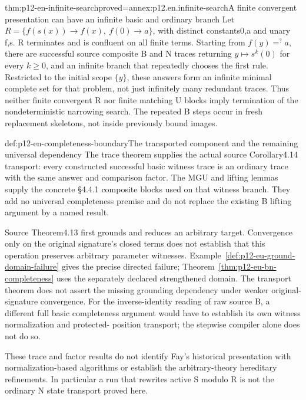 \begin{hbtheorem}{thm:p12-en-infinite-search}{proved=annex:p12.en.infinite-search}{A finite convergent presentation can have an infinite basic and ordinary branch}
Let \(R=\{f(s(x))\to f(x),\ f(0)\to a\}\), with distinct
constants0,a and unary f,s. R terminates and is confluent on all
finite terms. Starting from \(f(y)=^{?}a\), there are successful
source composite B and N traces returning \(y\mapsto s^k(0)\)
for every \(k\geq0\), and an infinite branch that repeatedly
chooses the first rule. Restricted to the initial scope \(\{y\}\),
these answers form an infinite minimal complete set for that problem,
not just infinitely many redundant traces. Thus neither finite convergent R nor finite
matching U blocks imply termination of the nondeterministic narrowing
search. The repeated B steps occur in fresh replacement skeletons,
not inside previously bound images.
\end{hbtheorem}

\begin{proofboundary}{def:p12-en-completeness-boundary}{The transported component and the remaining universal dependency}
The trace theorem supplies the actual source Corollary4.14 transport:
every constructed successful basic witness trace is an ordinary trace
with the same answer and comparison factor. The MGU and lifting
lemmas supply the concrete \S4.4.1 composite blocks used on that
witness branch. They add no universal completeness premise and
do not replace the existing B lifting argument by a named result.

Source Theorem4.13 first grounds and reduces an arbitrary target.
Convergence only on the original signature's closed terms does not
establish that this operation preserves arbitrary parameter witnesses.
Example~\ref{def:p12-eu-ground-domain-failure} gives the precise
directed failure; Theorem~\ref{thm:p12-eu-bn-completeness} uses the
separately declared strengthened domain. The transport theorem does
not assert the missing grounding dependency under weaker original-
signature convergence. For the inverse-identity
reading of raw source B, a different full basic completeness argument
would have to establish its own witness normalization and protected-
position transport; the stepwise compiler alone does not do so.

These trace and factor results do not identify Fay's historical
presentation with normalization-based algorithms or establish the
arbitrary-theory hereditary refinements. In particular a run that
rewrites active S modulo R is not the ordinary N state transport
proved here.
\cite[Theorem4.13, Corollary4.14 and \S4.4.1, pp.~497--499]{BaaderSnyder2001}
\end{proofboundary}
